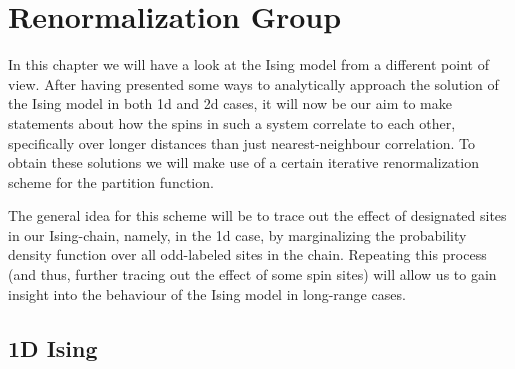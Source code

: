 
\chapter{Renormalization Group}

In this chapter we will have a look at the Ising model from a different point of view. After having presented some ways to analytically approach the solution of the Ising model in both 1d and 2d cases, it will now be our aim to make statements about how the spins in such a system correlate to each other, specifically over longer distances than just nearest-neighbour correlation. To obtain these solutions we will make use of a certain iterative renormalization scheme for the partition function.

The general idea for this scheme will be to trace out the effect of designated sites in our Ising-chain, namely, in the 1d case, by marginalizing the probability density function over all odd-labeled sites in the chain. Repeating this process (and thus, further tracing out the effect of some spin sites) will allow us to gain insight into the behaviour of the Ising model in long-range cases.

\section{1D Ising}

